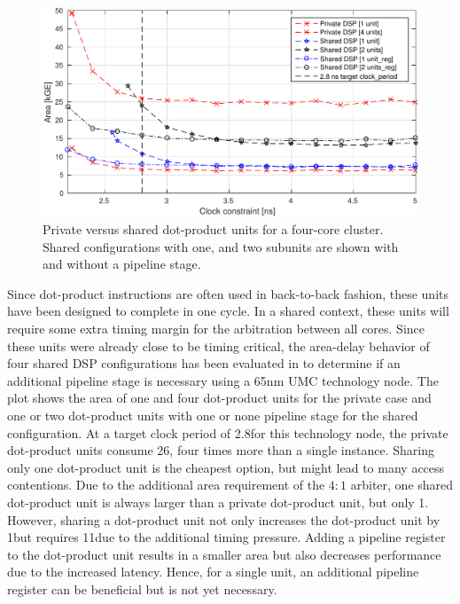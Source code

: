 \documentclass[%
 oneside,      %
 openany,      %
 halfparskip,  %
]{scrbook}
\begin{document}
\begin{figure}[t]
\centering
  \includegraphics[width=0.95\linewidth]{figures/AT_dsp_units.pdf}
  \caption{Private versus shared dot-product units for a four-core cluster. Shared configurations with one, and two subunits are shown with and without a pipeline stage.}
  \label{fig_apu:dsp_at}
\end{figure}

Since dot-product instructions are often used in back-to-back fashion, these units have been designed to complete in one cycle. In a shared context, these units will require some extra timing margin for the arbitration between all cores. Since these units were already close to be timing critical, the area-delay behavior of four shared DSP configurations has been evaluated in  to determine if an additional pipeline stage is necessary using a 65nm UMC technology node.
The plot shows the area of one and four dot-product units for the private case and one or two dot-product units with one or none pipeline stage for the shared configuration. At a target clock period of 2.8\ns for this technology node, the private dot-product units consume 26\kGE, four times more than a single instance. Sharing only one dot-product unit is the cheapest option, but might lead to many access contentions. Due to the additional area requirement of the $4:1$ arbiter, one shared dot-product unit is always larger than a private dot-product unit, but only 1\kGE. However, sharing a dot-product unit not only increases the dot-product unit by 1\kGE but requires 11\kGE due to the additional timing pressure. Adding a pipeline register to the dot-product unit results in a smaller area but also decreases performance due to the increased latency. Hence, for a single unit, an additional pipeline register can be beneficial but is not yet necessary.
\end{document}

